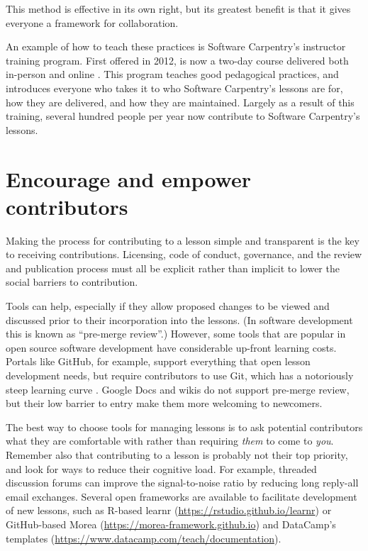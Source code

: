 \documentclass[10pt,letterpaper]{article}
\newcommand{\rulemajor}[2]{\section{#1}\label{#2}}
\begin{document}
\noindent
This method is effective in its own right,
but its greatest benefit is that it gives everyone a framework for collaboration.

An example of how to teach these practices is Software Carpentry's instructor training program.
First offered in 2012,
is now a two-day course delivered both in-person and online
\cite{lessons-learned,instructor-training,how-to-teach-programming}.
This program teaches good pedagogical practices,
and introduces everyone who takes it to who Software Carpentry's lessons are for,
how they are delivered,
and how they are maintained.
Largely as a result of this training,
several hundred people per year now contribute to Software Carpentry's lessons.

\rulemajor{Encourage and empower contributors}{empower}

Making the process for contributing to a lesson simple and transparent
is the key to receiving contributions.
Licensing, code of conduct, governance, and the review and publication process
must all be explicit rather than implicit
to lower the social barriers to contribution.

Tools can help,
especially if they allow proposed changes to be viewed and discussed
prior to their incorporation into the lessons.
(In software development this is known as ``pre-merge review''.)
However,
some tools that are popular in open source software development have considerable up-front learning costs.
Portals like GitHub,
for example,
support everything that open lesson development needs,
but require contributors to use Git,
which has a notoriously steep learning curve \cite{git-survey}.
Google Docs and wikis do not support pre-merge review,
but their low barrier to entry make them more welcoming to newcomers.

The best way to choose tools for managing lessons is
to ask potential contributors what they are comfortable with
rather than requiring \emph{them} to come to \emph{you}.
Remember also that contributing to a lesson is probably not their top priority,
and look for ways to reduce their cognitive load.
For example,
threaded discussion forums can improve the signal-to-noise ratio
by reducing long reply-all email exchanges.
Several open frameworks are available to facilitate development of new lessons,
such as R-based learnr (\url{https://rstudio.github.io/learnr})
or GitHub-based Morea (\url{https://morea-framework.github.io})
and DataCamp's templates (\url{https://www.datacamp.com/teach/documentation}).
\end{document}
